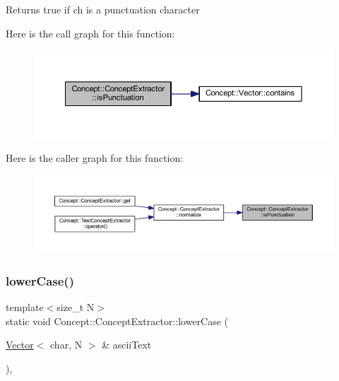 \begin{DoxyReturn}{Returns}
true if ch is a punctuation character 
\end{DoxyReturn}
Here is the call graph for this function\+:\nopagebreak
\begin{figure}[H]
\begin{center}
\leavevmode
\includegraphics[width=350pt]{class_concept_1_1_concept_extractor_ab4ca9179d4756d3d68b47c7256aea880_cgraph}
\end{center}
\end{figure}
Here is the caller graph for this function\+:\nopagebreak
\begin{figure}[H]
\begin{center}
\leavevmode
\includegraphics[width=350pt]{class_concept_1_1_concept_extractor_ab4ca9179d4756d3d68b47c7256aea880_icgraph}
\end{center}
\end{figure}
\mbox{\label{class_concept_1_1_concept_extractor_a975f600a76c667d317fbde638ebb0c48}} 
\subsubsection{\texorpdfstring{lowerCase()}{lowerCase()}}
{\footnotesize\ttfamily template$<$size\+\_\+t N$>$ \\
static void Concept\+::\+Concept\+Extractor\+::lower\+Case (\begin{DoxyParamCaption}\item[{\mbox{\hyperlink{class_concept_1_1_vector}{Vector}}$<$ char, N $>$ \&}]{ascii\+Text }\end{DoxyParamCaption})\hspace{0.3cm}{\ttfamily [inline]}, {\ttfamily [static]}}

